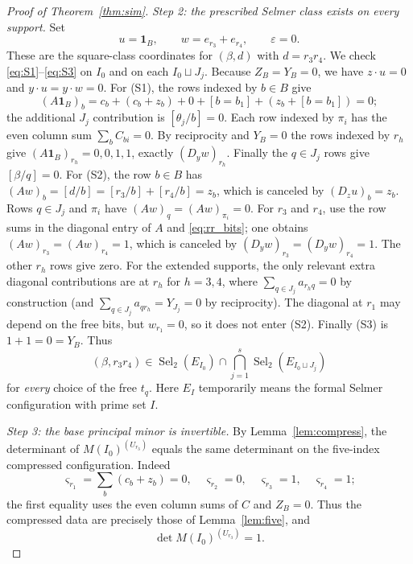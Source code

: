 \documentclass[11pt,a4paper]{article}
\theoremstyle{definition}
\newcommand{\Sel}{\operatorname{Sel}_2}
\newcommand{\one}{\boldsymbol{1}}
\begin{document}
\begin{proof}[Proof of Theorem~\ref{thm:sim}]
\emph{Step 2: the prescribed Selmer class exists on every support.}
Set
\[
             u=\one_B,\qquad
             w=e_{r_3}+e_{r_4},\qquad \varepsilon=0.
\]
These are the square-class coordinates for
$(\beta,d)$ with $d=r_3r_4$.
We check \eqref{eq:S1}--\eqref{eq:S3} on $I_0$
and on each $I_0\sqcup J_j$.
Because $Z_B=Y_B=0$, we have $z\cdot u=0$ and
$y\cdot u=y\cdot w=0$.
For (S1), the rows indexed by $b\in B$ give
\[
 (A\one_B)_b
 =c_b+(c_b+z_b)+0+[b=b_1]+(z_b+[b=b_1])=0;
\]
the additional $J_j$ contribution is
$[\theta_j/b]=0$.  Each row indexed by $\pi_i$
has the even column sum $\sum_bC_{bi}=0$.
By reciprocity and $Y_B=0$ the rows indexed by $r_h$
give $(A\one_B)_{r_h}=0,0,1,1$, exactly
$(D_yw)_{r_h}$.  Finally the $q\in J_j$ rows give
$[\beta/q]=0$.
For (S2), the row $b\in B$ has
$(Aw)_b=[d/b]=[r_3/b]+[r_4/b]=z_b$,
which is canceled by $(D_z u)_b=z_b$.
Rows $q\in J_j$ and $\pi_i$ have $(Aw)_q=(Aw)_{\pi_i}=0$.
For $r_3$ and $r_4$, use the row sums in the diagonal
entry of $A$ and \eqref{eq:rr_bits}; one obtains
$(Aw)_{r_3}=(Aw)_{r_4}=1$, which is canceled by
$(D_yw)_{r_3}=(D_yw)_{r_4}=1$.
The other $r_h$ rows give zero.  For the extended
supports, the only relevant extra diagonal contributions
are at $r_h$ for $h=3,4$, where
$\sum_{q\in J_j}a_{r_hq}=0$ by construction (and
$\sum_{q\in J_j}a_{q r_h}=Y_{J_j}=0$ by reciprocity).
The diagonal at $r_1$ may depend on the free bits, but
$w_{r_1}=0$, so it does not enter (S2).
Finally (S3) is $1+1=0=Y_B$.  Thus
\begin{equation}\label{eq:class_all}
            (\beta,r_3r_4)\in\Sel(E_{I_0})
               \cap\bigcap_{j=1}^s\Sel(E_{I_0\sqcup J_j})
\end{equation}
for \emph{every} choice of the free $t_q$.
Here $E_I$ temporarily means the formal Selmer
configuration with prime set $I$.

\emph{Step 3: the base principal minor is invertible.}
By Lemma~\ref{lem:compress}, the determinant of
$M(I_0)^{(U_{r_3})}$ equals the same determinant on the
five-index compressed configuration.  Indeed
\[
 \varsigma_{r_1}=\sum_b(c_b+z_b)=0,\quad
 \varsigma_{r_2}=0,\quad
 \varsigma_{r_3}=1,\quad
 \varsigma_{r_4}=1;
\]
the first equality uses the even column sums of $C$
and $Z_B=0$.  Thus the compressed data are precisely
those of Lemma~\ref{lem:five}, and
\begin{equation}\label{eq:baseminor}
                      \det M(I_0)^{(U_{r_3})}=1.
\end{equation}


\end{proof}
\end{document}
